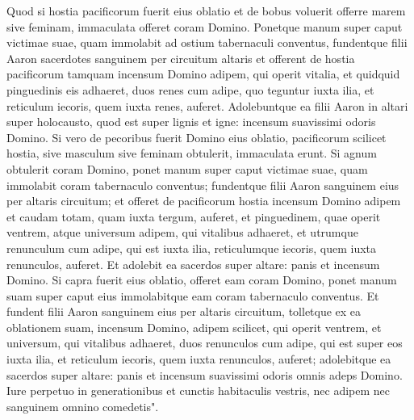 \begin{biblechapter}  
\verse Quod si hostia pacificorum fuerit eius oblatio et de bobus voluerit offerre marem sive feminam, immaculata offeret coram Domino. 
\verse Ponetque manum super caput victimae suae, quam immolabit ad ostium tabernaculi conventus, fundentque filii Aaron sacerdotes sanguinem per circuitum altaris 
\verse et offerent de hostia pacificorum tamquam incensum Domino adipem, qui operit vitalia, et quidquid pinguedinis eis adhaeret, 
\verse duos renes cum adipe, quo teguntur iuxta ilia, et reticulum iecoris, quem iuxta renes, auferet. 
\verse Adolebuntque ea filii Aaron in altari super holocausto, quod est super lignis et igne: incensum suavissimi odoris Domino. 
\verse Si vero de pecoribus fuerit Domino eius oblatio, pacificorum scilicet hostia, sive masculum sive feminam obtulerit, immaculata erunt. 
\verse Si agnum obtulerit coram Domino, 
\verse ponet manum super caput victimae suae, quam immolabit coram tabernaculo conventus; fundentque filii Aaron sanguinem eius per altaris circuitum; 
\verse et offeret de pacificorum hostia incensum Domino adipem et caudam totam, quam iuxta tergum, auferet, et pinguedinem, quae operit ventrem, atque universum adipem, qui vitalibus adhaeret, 
\verse et utrumque renunculum cum adipe, qui est iuxta ilia, reticulumque iecoris, quem iuxta renunculos, auferet. 
\verse Et adolebit ea sacerdos super altare: panis et incensum Domino. 
\verse Si capra fuerit eius oblatio, offeret eam coram Domino, 
\verse ponet manum suam super caput eius immolabitque eam coram tabernaculo conventus. Et fundent filii Aaron sanguinem eius per altaris circuitum, 
\verse tolletque ex ea oblationem suam, incensum Domino, adipem scilicet, qui operit ventrem, et universum, qui vitalibus adhaeret, 
\verse duos renunculos cum adipe, qui est super eos iuxta ilia, et reticulum iecoris, quem iuxta renunculos, auferet;  
\verse adolebitque ea sacerdos super altare: panis et incensum suavissimi odoris omnis adeps Domino. 
\verse Iure perpetuo in generationibus et cunctis habitaculis vestris, nec adipem nec sanguinem omnino comedetis". 
\end{biblechapter}

